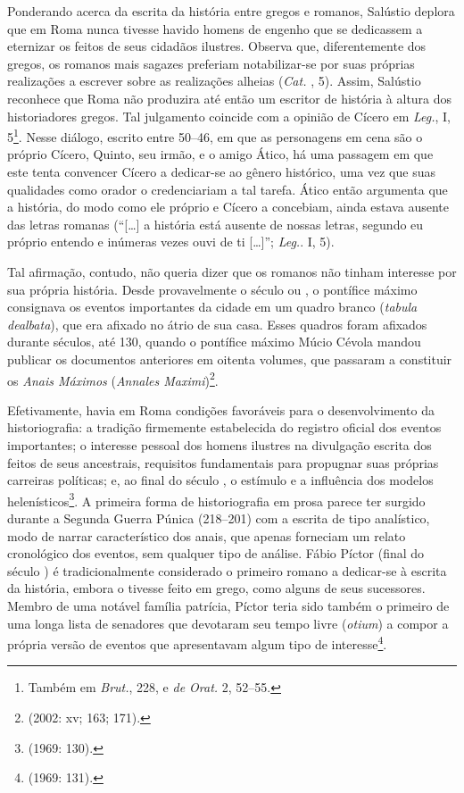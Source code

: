  Ponderando acerca da escrita da história entre gregos e romanos, Salústio
 deplora que em Roma nunca tivesse havido homens de engenho que se dedicassem a
 eternizar os feitos de seus cidadãos ilustres. Observa que, diferentemente dos
 gregos, os romanos mais sagazes preferiam notabilizar-se por suas próprias
 realizações a escrever sobre as realizações alheias (\emph{Cat.} , 5). Assim,
 Salústio reconhece que Roma não produzira até então um escritor de história à
 altura dos historiadores gregos. Tal julgamento coincide com a opinião de
 Cícero em \emph{Leg.}, I, 5\footnote{Também em \emph{Brut.}, 228, e
 \emph{de Orat.} 2, 52--55.}.  Nesse diálogo, escrito entre
 50--46, em que as personagens em cena são o próprio Cícero, Quinto, seu irmão,
 e o amigo Ático, há uma passagem em que este tenta convencer Cícero a
 dedicar-se ao gênero histórico, uma vez que suas qualidades como orador o
 credenciariam a tal tarefa.  Ático então argumenta que a história, do modo
 como ele próprio e Cícero a concebiam, ainda estava ausente das letras romanas
 (“[\ldots{}] a história está ausente de nossas letras, segundo eu próprio entendo e
 inúmeras vezes ouvi de ti [\ldots{}]”;  \emph{Leg.}. I, 5). 

Tal afirmação, contudo, não queria dizer que os romanos não tinham interesse
por sua própria história. Desde provavelmente o século  ou , o  
pontífice máximo consignava os eventos importantes da cidade em um quadro branco
(\emph{tabula dealbata}), que era afixado no átrio de sua casa. Esses quadros
foram afixados durante séculos, até 130,  quando o  pontífice máximo Múcio
Cévola mandou publicar os documentos anteriores em oitenta volumes, que
passaram a constituir os \emph{Anais Máximos} (\emph{Annales
Maximi})\footnote{ (2002: xv; 163; 171).}. 

Efetivamente, havia em Roma condições favoráveis para o desenvolvimento da
historiografia: a tradição firmemente estabelecida do registro oficial dos
eventos importantes; o interesse pessoal dos homens ilustres na divulgação
escrita dos feitos de seus ancestrais, requisitos fundamentais para propugnar
suas próprias carreiras políticas; e, ao final do século , o estímulo
e a influência dos modelos helenísticos\footnote{ (1969: 130).}.    A
primeira forma de historiografia em prosa parece ter surgido durante a Segunda
Guerra Púnica (218--201) com a escrita de tipo analístico, modo de narrar
característico dos anais, que apenas forneciam um relato cronológico dos
eventos, sem qualquer tipo de análise. Fábio Píctor (final do século ) 
é tradicionalmente considerado o primeiro romano a dedicar-se à escrita da história,
embora o tivesse feito em grego, como alguns de seus sucessores. Membro de uma
notável família patrícia, Píctor teria sido também o primeiro de uma longa
lista de senadores que devotaram seu tempo livre (\emph{otium}) a compor a
própria versão de eventos que apresentavam algum tipo de
interesse\footnote{ (1969: 131).}.


